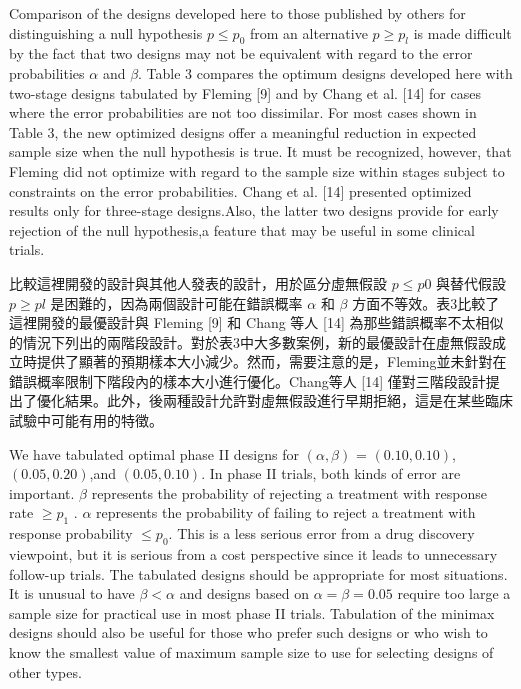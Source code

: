 	Comparison of the designs developed here to those published by others for distinguishing a null hypothesis $p\leq p_0$ from an alternative $ p \geq p_l $ is made difficult by the fact that two designs may not be equivalent with regard to the error probabilities $\alpha$ and $\beta$. Table 3 compares the optimum designs developed here with two-stage designs tabulated by Fleming [9] and by Chang et al. [14] for cases where the error probabilities are not too dissimilar. For most cases shown in Table 3, the new optimized designs offer a meaningful reduction in expected sample size when the null hypothesis is true. It must be recognized, however, that Fleming did not optimize with regard to the sample size within stages subject to constraints on the error probabilities. Chang et al. [14] presented optimized results only for three-stage designs.Also, the latter two designs provide for early rejection of the null hypothesis,a feature that may be useful in some clinical trials.

	比較這裡開發的設計與其他人發表的設計，用於區分虛無假設 $p\leq p0$ 與替代假設 $ p \geq pl $ 是困難的，因為兩個設計可能在錯誤概率 $\alpha$ 和 $\beta$ 方面不等效。表3比較了這裡開發的最優設計與 Fleming [9] 和 Chang 等人 [14] 為那些錯誤概率不太相似的情況下列出的兩階段設計。對於表3中大多數案例，新的最優設計在虛無假設成立時提供了顯著的預期樣本大小減少。然而，需要注意的是，Fleming並未針對在錯誤概率限制下階段內的樣本大小進行優化。Chang等人 [14] 僅對三階段設計提出了優化結果。此外，後兩種設計允許對虛無假設進行早期拒絕，這是在某些臨床試驗中可能有用的特徵。

	We have tabulated optimal phase II designs for $(\alpha,\beta)$ = $(0.10,0.10)$, $(0.05,0.20)$,and $(0.05,0.10)$. In phase II trials, both kinds of error are important. $\beta$ represents the probability of rejecting a treatment with response rate $\geq p_1$ . $\alpha$ represents the probability of failing to reject a treatment with response probability $\leq p_0$. This is a less serious error from a drug discovery viewpoint, but it is serious from a cost perspective since it leads to unnecessary follow-up trials. The tabulated designs should be appropriate for most situations. It is unusual to have $ \beta < \alpha $ and designs based on $ \alpha = \beta = 0.05 $ require too large a sample size for practical use in most phase II trials. Tabulation of the minimax designs should also be useful for those who prefer such designs or who wish to know the smallest value of maximum sample size to use for selecting designs of other types. 

